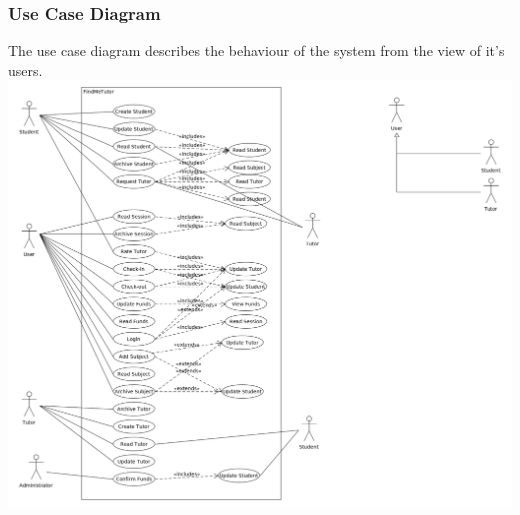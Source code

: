 \documentclass[12pt]{article}
\begin{document}
\subsubsection{Use Case Diagram}
The use case diagram describes the behaviour of the system from the view of it's users.\\
\includegraphics[width=140mm]{./Use_Case_Diagram.png}
\end{document}
